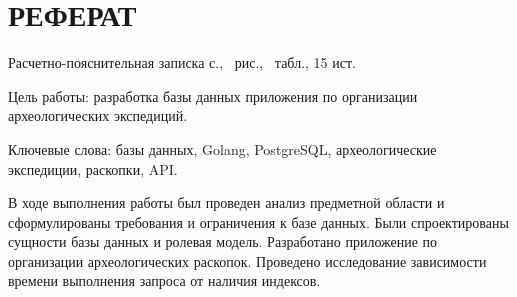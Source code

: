 \section*{РЕФЕРАТ}
\setcounter{page}{3}

Расчетно-пояснительная записка \pageref{LastPage} с., \totalfigures\ рис., \totaltables\ табл., 15 ист.

Цель работы: разработка базы данных приложения по организации археологических экспедиций.

Ключевые слова: базы данных,  Golang, PostgreSQL, археологические экспедиции, раскопки, API.

В ходе выполнения работы был проведен анализ предметной области и сформулированы требования и ограничения к базе данных. Были спроектированы сущности базы данных и ролевая модель. Разработано приложение по организации археологических раскопок. Проведено исследование зависимости времени выполнения запроса от наличия индексов.

 

\pagebreak
